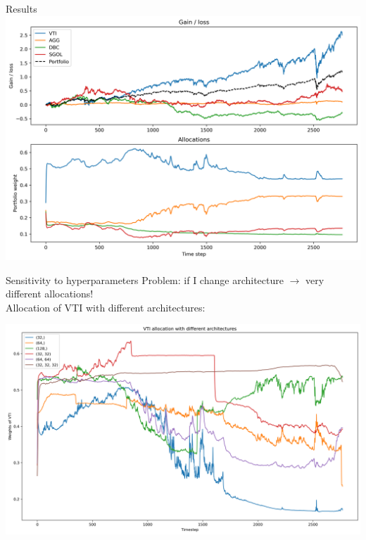 \documentclass[pdf]{beamer}
\begin{document}
	\begin{frame}{Results}
		\centering
		\includegraphics[width=\textwidth]{deep_learning_optimization.png}
	\end{frame}

	\begin{frame}{Sensitivity to hyperparameters}
		\alert{Problem:} if I change architecture $\to$ very different allocations!\\
		Allocation of VTI with different architectures:
		
		\vfill
		\centering
		\includegraphics[width=\textwidth]{hyperscan.png}
	\end{frame}
\end{document}
